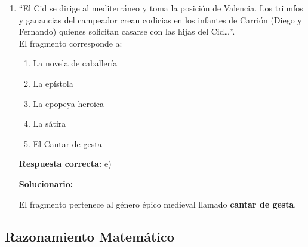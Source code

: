 \begin{enumerate}[resume]
	\vspace{2mm}
	\textbf{Solucionario:}
	
	“Rumi Ñawi” significa \textbf{ojos de piedra}.
	
	\vspace{6mm}
	
	\item “El Cid se dirige al mediterráneo y toma la posición de Valencia. Los triunfos y ganancias del campeador crean codicias en los infantes de Carrión (Diego y Fernando) quienes solicitan casarse con las hijas del Cid…”.\\
	El fragmento corresponde a:
	\begin{enumerate}[label=\alph*)]
		\item La novela de caballería
		\item La epístola
		\item La epopeya heroica
		\item La sátira
		\item El Cantar de gesta
	\end{enumerate}
	\textbf{Respuesta correcta:} e)
	
	\vspace{2mm}
	\textbf{Solucionario:}
	
	El fragmento pertenece al género épico medieval llamado \textbf{cantar de gesta}.
	
	\vspace{6mm}
	
\end{enumerate}


\subsection*{Razonamiento Matemático}

